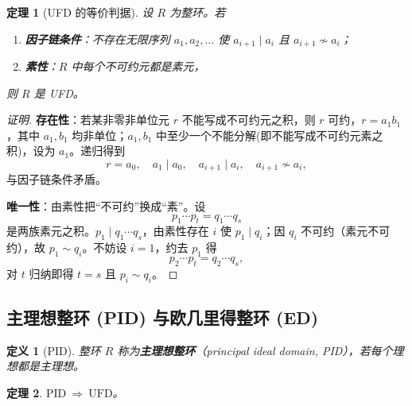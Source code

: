 \documentclass[11pt,a4paper]{ctexart}
\newtheorem*{theorem}{定理}
\newtheorem*{definition}{定义}
\theoremstyle{remark}
\begin{document}
\begin{theorem}[UFD 的等价判据]
设 $R$ 为整环。若
\begin{enumerate}
    \item \textbf{因子链条件}：不存在无限序列 $a_1,a_2,\dots$ 使 $a_{i+1}\mid a_i$ 且 $a_{i+1}\nsim a_i$；
    \item \textbf{素性}：$R$ 中每个不可约元都是素元，
\end{enumerate}
则 $R$ 是 UFD。
\end{theorem}

\begin{proof}[证明]
\textbf{存在性}：若某非零非单位元 $r$ 不能写成不可约元之积，则 $r$ 可约，$r=a_1b_1$，其中 $a_1,b_1$ 均非单位；$a_1,b_1$ 中至少一个不能分解(即不能写成不可约元素之积)，设为 $a_1$。递归得到
\[
r=a_0,\quad a_1\mid a_0,\quad a_{i+1}\mid a_i,\quad a_{i+1}\nsim a_i ,
\]
与因子链条件矛盾。

\textbf{唯一性}：由素性把“不可约”换成“素”。设
\[
p_1\cdots p_t=q_1\cdots q_s
\]
是两族素元之积。$p_1\mid q_1\cdots q_s$，由素性存在 $i$ 使 $p_1\mid q_i$；因 $q_i$ 不可约（素元不可约），故 $p_1\sim q_i$。不妨设 $i=1$，约去 $p_1$ 得
\[
p_2\cdots p_t=q_2\cdots q_s ,
\]
对 $t$ 归纳即得 $t=s$ 且 $p_i\sim q_i$。
\end{proof}

\subsection*{主理想整环 (PID) 与欧几里得整环 (ED)}

\begin{definition}[PID]
整环 $R$ 称为\textbf{主理想整环}（principal ideal domain, PID），若每个理想都是主理想。
\end{definition}

\begin{theorem}
$\mathrm{PID}\ \Longrightarrow\ \mathrm{UFD}$。
\end{theorem}
\end{document}
